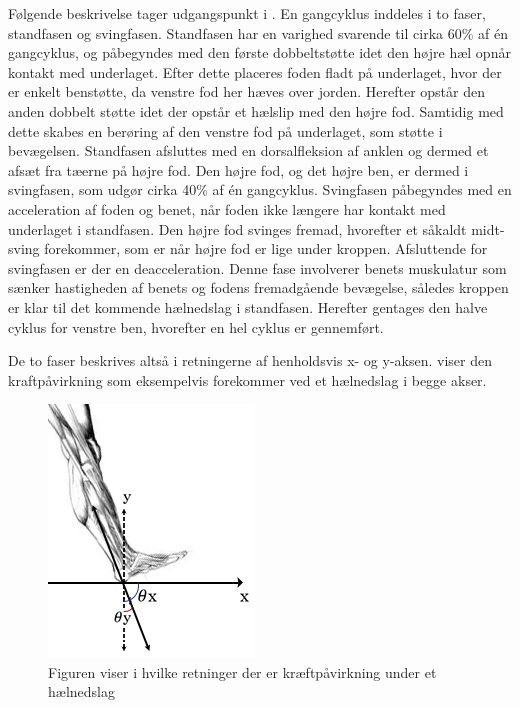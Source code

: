 Følgende beskrivelse tager udgangspunkt i . En gangcyklus inddeles i to faser, standfasen og svingfasen.
Standfasen har en varighed svarende til cirka 60\% af én gangcyklus, og påbegyndes med den første dobbeltstøtte idet den højre hæl opnår kontakt med underlaget. Efter dette placeres foden fladt på underlaget, hvor der er enkelt benstøtte, da venstre fod her hæves over jorden. Herefter opstår den anden dobbelt støtte idet der opstår et hælslip med den højre fod. Samtidig med dette skabes en berøring af den venstre fod på underlaget, som støtte i bevægelsen. Standfasen afsluttes med en dorsalfleksion af anklen og dermed et afsæt fra tæerne på højre fod.\citep{VaughanDavisOConnor1992,Whittle1990}  \newline 
Den højre fod, og det højre ben, er dermed i svingfasen, som udgør cirka 40\% af én gangcyklus. Svingfasen påbegyndes med en acceleration af foden og benet, når foden ikke længere har kontakt med underlaget i standfasen. Den højre fod svinges fremad, hvorefter et såkaldt midt-sving forekommer, som er når højre fod er lige under kroppen. Afsluttende for svingfasen er der en deacceleration. Denne fase involverer benets muskulatur som sænker hastigheden af benets og fodens fremadgående bevægelse, således kroppen er klar til det kommende hælnedslag i standfasen. Herefter gentages den halve cyklus for venstre ben, hvorefter en hel cyklus er gennemført.\citep{VaughanDavisOConnor1992,Whittle1990}

De to faser beskrives altså i retningerne af henholdsvis x- og y-aksen.  viser den kraftpåvirkning som eksempelvis forekommer ved et hælnedslag i begge akser.  

\begin{figure}[H]
	\centering
	\includegraphics[scale=0.7]{figures/bProblemloesning/kraefter_akser.png}
	\caption{Figuren viser i hvilke retninger der er kræftpåvirkning under et hælnedslag}
	\label{fig:kraefter_akser}
\end{figure}


